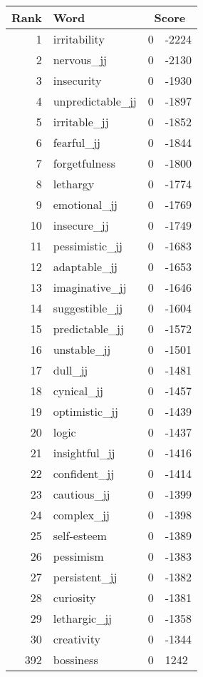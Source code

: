 \begin{longtable}[!htbp]{| rlr@{.}l |}
    \hline
    \textbf{Rank} & \textbf{Word} & \multicolumn{2}{c|}{\textbf{Score}} \\
    \hline
    \endhead
    1 & irritability & 0 & -2224 \\
    2 & nervous\_jj & 0 & -2130 \\
    3 & insecurity & 0 & -1930 \\
    4 & unpredictable\_jj & 0 & -1897 \\
    5 & irritable\_jj & 0 & -1852 \\
    6 & fearful\_jj & 0 & -1844 \\
    7 & forgetfulness & 0 & -1800 \\
    8 & lethargy & 0 & -1774 \\
    9 & emotional\_jj & 0 & -1769 \\
    10 & insecure\_jj & 0 & -1749 \\
    11 & pessimistic\_jj & 0 & -1683 \\
    12 & adaptable\_jj & 0 & -1653 \\
    13 & imaginative\_jj & 0 & -1646 \\
    14 & suggestible\_jj & 0 & -1604 \\
    15 & predictable\_jj & 0 & -1572 \\
    16 & unstable\_jj & 0 & -1501 \\
    17 & dull\_jj & 0 & -1481 \\
    18 & cynical\_jj & 0 & -1457 \\
    19 & optimistic\_jj & 0 & -1439 \\
    20 & logic & 0 & -1437 \\
    21 & insightful\_jj & 0 & -1416 \\
    22 & confident\_jj & 0 & -1414 \\
    23 & cautious\_jj & 0 & -1399 \\
    24 & complex\_jj & 0 & -1398 \\
    25 & self-esteem & 0 & -1389 \\
    26 & pessimism & 0 & -1383 \\
    27 & persistent\_jj & 0 & -1382 \\
    28 & curiosity & 0 & -1381 \\
    29 & lethargic\_jj & 0 & -1358 \\
    30 & creativity & 0 & -1344 \\
    392 & bossiness & 0 & 1242 \\

\end{longtable}
